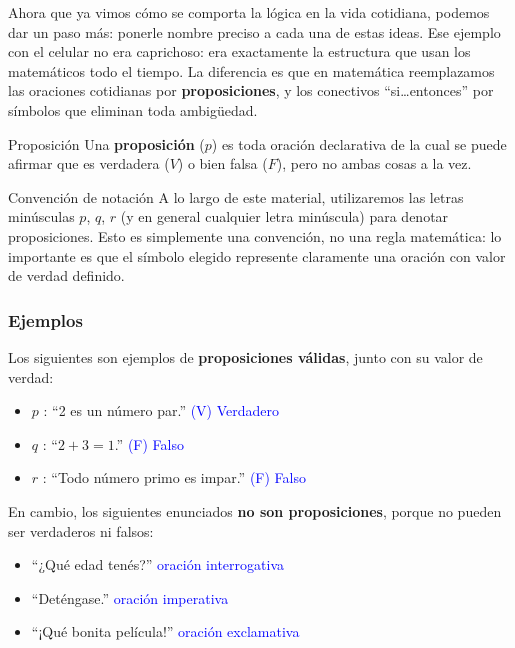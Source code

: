 Ahora que ya vimos cómo se comporta la lógica en la vida cotidiana, podemos dar un paso más: ponerle nombre preciso a cada una de estas ideas. Ese ejemplo con el celular no era caprichoso: era exactamente la estructura que usan los matemáticos todo el tiempo. La diferencia es que en matemática reemplazamos las oraciones cotidianas por \textbf{proposiciones}, y los conectivos ``si\ldots entonces'' por símbolos que eliminan toda ambigüedad.

\begin{dfn}{Proposición}
    Una \textbf{proposición} ($p$) es toda oración declarativa de la cual se puede afirmar que es verdadera ($V$) o bien falsa ($F$), pero no ambas cosas a la vez.
\end{dfn}

\begin{obs}{Convención de notación}
    A lo largo de este material, utilizaremos las letras minúsculas $p$, $q$, $r$ (y en general cualquier letra minúscula) para denotar proposiciones. Esto es simplemente una convención, no una regla matemática: lo importante es que el símbolo elegido represente claramente una oración con valor de verdad definido.
\end{obs}

\subsubsection{\texorpdfstring{Ejemplos}{Ejemplos}}

\noindent Los siguientes son ejemplos de \textbf{proposiciones válidas}, junto con su valor de verdad:

\begin{itemize}
    \item $p$ : ``2 es un número par.'' \hfill \textcolor{blue}{(V) Verdadero}
    \item $q$ : ``$2 + 3 = 1$.'' \hfill \textcolor{blue}{(F) Falso}
    \item $r$ : ``Todo número primo es impar.'' \hfill \textcolor{blue}{(F) Falso}
\end{itemize}

\noindent En cambio, los siguientes enunciados \textbf{no son proposiciones}, porque no pueden ser verdaderos ni falsos:

\begin{itemize}
    \item ``¿Qué edad tenés?'' \hfill \textcolor{blue}{oración interrogativa}
    \item ``Deténgase.'' \hfill \textcolor{blue}{oración imperativa}
    \item ``¡Qué bonita película!'' \hfill \textcolor{blue}{oración exclamativa}
\end{itemize}

